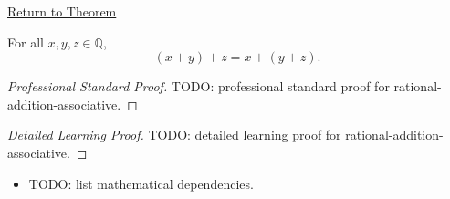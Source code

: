 \newpage
{}
\label{prf:rational-addition-associative}

\begin{remark*}[Return]
\hyperref[thm:rational-addition-associative]{Return to Theorem}
\end{remark*}

\begin{theorem*}
For all $x,y,z\in\mathbb{Q}$,
\[
(x+y)+z=x+(y+z).
\]
\end{theorem*}

\begin{proof}[Professional Standard Proof]
\LRAProofBodyStart
TODO: professional standard proof for rational-addition-associative.
\end{proof}

\begin{proof}[Detailed Learning Proof]
\LRAProofBodyStart
TODO: detailed learning proof for rational-addition-associative.
\end{proof}

\begin{remark*}
\end{remark*}

\begin{dependencies}
\begin{itemize}
  \item TODO: list mathematical dependencies.
\end{itemize}
\end{dependencies}

\clearpage

